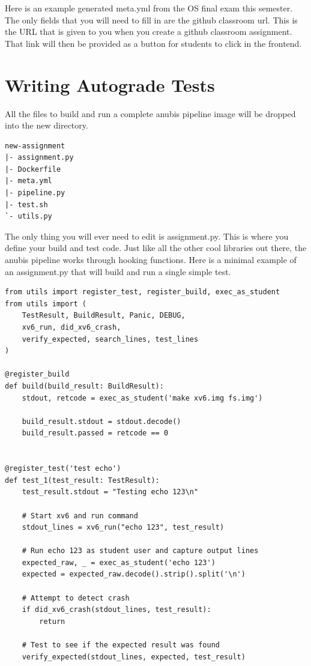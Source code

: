 Here is an example generated meta.yml from the OS final exam this semester.
The only fields that you will need to fill in are the github classroom url.
This is the URL that is given to you when you create a github classroom assignment.
That link will then be provided as a button for students to click in the frontend.


\section{Writing Autograde Tests}

All the files to build and run a complete anubis pipeline image will be dropped into the new directory.

\begin{verbatim}
new-assignment
|- assignment.py
|- Dockerfile
|- meta.yml
|- pipeline.py
|- test.sh
`- utils.py
\end{verbatim}

The only thing you will ever need to edit is assignment.py.
This is where you define your build and test code.
Just like all the other cool libraries out there, the anubis pipeline works
through hooking functions.
Here is a minimal example of an assignment.py that will build and run a single simple test.

\begin{verbatim}
from utils import register_test, register_build, exec_as_student
from utils import (
    TestResult, BuildResult, Panic, DEBUG,
    xv6_run, did_xv6_crash,
    verify_expected, search_lines, test_lines
)

@register_build
def build(build_result: BuildResult):
    stdout, retcode = exec_as_student('make xv6.img fs.img')

    build_result.stdout = stdout.decode()
    build_result.passed = retcode == 0


@register_test('test echo')
def test_1(test_result: TestResult):
    test_result.stdout = "Testing echo 123\n"

    # Start xv6 and run command
    stdout_lines = xv6_run("echo 123", test_result)

    # Run echo 123 as student user and capture output lines
    expected_raw, _ = exec_as_student('echo 123')
    expected = expected_raw.decode().strip().split('\n')

    # Attempt to detect crash
    if did_xv6_crash(stdout_lines, test_result):
        return

    # Test to see if the expected result was found
    verify_expected(stdout_lines, expected, test_result)
\end{verbatim}


